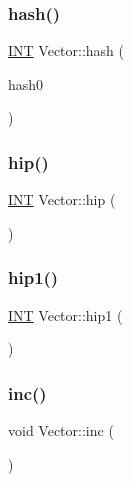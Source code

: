 \subsubsection{\texorpdfstring{hash()}{hash()}}
{\footnotesize\ttfamily \mbox{\hyperlink{galois_8h_a09fddde158a3a20bd2dcadb609de11dc}{I\+NT}} Vector\+::hash (\begin{DoxyParamCaption}\item[{\mbox{\hyperlink{galois_8h_a09fddde158a3a20bd2dcadb609de11dc}{I\+NT}}}]{hash0 }\end{DoxyParamCaption})}

\mbox{\label{class_vector_a996f4e7f37126389c883537b063d583e}} 
\subsubsection{\texorpdfstring{hip()}{hip()}}
{\footnotesize\ttfamily \mbox{\hyperlink{galois_8h_a09fddde158a3a20bd2dcadb609de11dc}{I\+NT}} Vector\+::hip (\begin{DoxyParamCaption}{ }\end{DoxyParamCaption})}

\mbox{\label{class_vector_a5ce49604a9d0d59e42e4cbad25597334}} 
\subsubsection{\texorpdfstring{hip1()}{hip1()}}
{\footnotesize\ttfamily \mbox{\hyperlink{galois_8h_a09fddde158a3a20bd2dcadb609de11dc}{I\+NT}} Vector\+::hip1 (\begin{DoxyParamCaption}{ }\end{DoxyParamCaption})}

\mbox{\label{class_vector_a5f6fe0531bc3d9829becd8503e4156a3}} 
\subsubsection{\texorpdfstring{inc()}{inc()}}
{\footnotesize\ttfamily void Vector\+::inc (\begin{DoxyParamCaption}{ }\end{DoxyParamCaption})\hspace{0.3cm}{\ttfamily [virtual]}}



